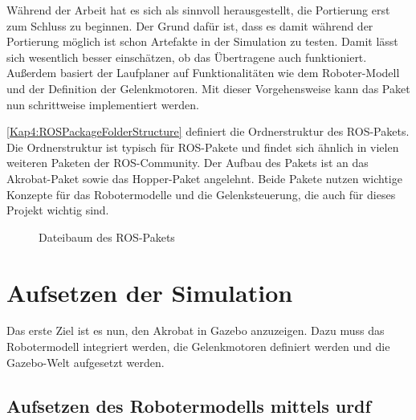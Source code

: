 Während der Arbeit hat es sich als sinnvoll herausgestellt, die Portierung erst zum Schluss zu beginnen. Der Grund dafür ist, dass es damit während der Portierung möglich ist schon Artefakte in der Simulation zu testen. Damit lässt sich wesentlich besser einschätzen, ob das Übertragene auch funktioniert. Außerdem basiert der Laufplaner auf Funktionalitäten wie dem Roboter-Modell und der Definition der Gelenkmotoren. Mit dieser Vorgehensweise kann das Paket nun schrittweise implementiert werden.

\autoref{Kap4:ROSPackageFolderStructure} definiert die Ordnerstruktur des \ac{ROS}-Pakets. Die Ordnerstruktur ist typisch für \ac{ROS}-Pakete und findet sich ähnlich in vielen weiteren Paketen der \ac{ROS}-Community. Der Aufbau des Pakets ist an das Akrobat-Paket \autocite{akrobat} sowie das Hopper-Paket \autocite{hopper} angelehnt. Beide Pakete nutzen wichtige Konzepte für das Robotermodelle und die Gelenksteuerung, die auch für dieses Projekt wichtig sind.

\begin{figure}[p!]
\caption{Dateibaum des ROS-Pakets}
\label{Kap4:ROSPackageFolderStructure}
\end{figure}

\section{Aufsetzen der Simulation}

Das erste Ziel ist es nun, den Akrobat in Gazebo anzuzeigen. Dazu muss das Robotermodell integriert werden, die Gelenkmotoren definiert werden und die Gazebo-Welt aufgesetzt werden.

\subsection{Aufsetzen des Robotermodells mittels urdf}

